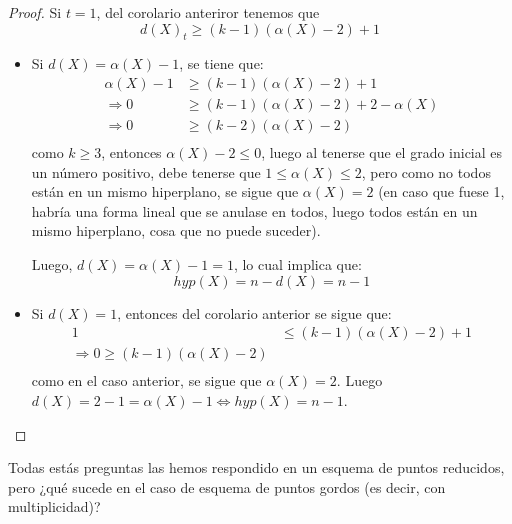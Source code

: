\documentclass[12pt]{report}
\newcounter{it}
\theoremstyle{largebreak}
\begin{document}
    \begin{proof}
        Si $t=1$, del corolario anteriror tenemos que
        \begin{equation*}
            d(X)_t\geq(k-1)(\alpha(X)-2)+1
        \end{equation*}
        \begin{itemize}
            \item Si $d(X)=\alpha(X)-1$, se tiene que:
            \begin{equation*}
                \begin{split}
                    \alpha(X)-1&\geq(k-1)(\alpha(X)-2)+1\\
                    \Rightarrow 0&\geq(k-1)(\alpha(X)-2)+2-\alpha(X)\\
                    \Rightarrow 0&\geq (k-2)(\alpha(X)-2)\\
                \end{split}
            \end{equation*}
            como $k\geq 3$, entonces $\alpha(X)-2\leq 0$, luego al tenerse que el grado inicial es un número positivo, debe tenerse que $1\leq\alpha(X)\leq 2$, pero como no todos están en un mismo hiperplano, se sigue que $\alpha(X)=2$ (en caso que fuese 1, habría una forma lineal que se anulase en todos, luego todos están en un mismo hiperplano, cosa que no puede suceder).

            Luego, $d(X)=\alpha(X)-1=1$, lo cual implica que:
            \begin{equation*}
                hyp(X)=n-d(X)=n-1
            \end{equation*}
            \item Si $d(X)=1$, entonces del corolario anterior se sigue que:
            \begin{equation*}
                \begin{split}
                    1&\leq(k-1)(\alpha(X)-2)+1\\
                    \Rightarrow 0\geq(k-1)(\alpha(X)-2)\\
                \end{split}
            \end{equation*}
            como en el caso anterior, se sigue que $\alpha(X)=2$. Luego $d(X)=2-1=\alpha(X)-1\iff hyp(X)=n-1$.
        \end{itemize}
    \end{proof}

    Todas estás preguntas las hemos respondido en un esquema de puntos reducidos, pero ¿qué sucede en el caso de esquema de puntos gordos (es decir, con multiplicidad)?
\end{document}

